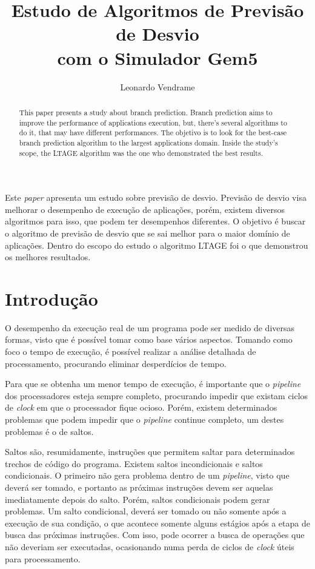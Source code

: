 \documentclass[12pt]{article}
\title{Estudo de Algoritmos de Previsão de Desvio\\com o Simulador Gem5}
\author{Leonardo Vendrame\inst{1}}
\begin{document}
 

\maketitle

\begin{abstract}
  This paper presents a study about branch prediction. Branch prediction aims to improve the performance
  of applications execution, but, there's several algorithms to do it, that may have different performances.
  The objetivo is to look for the best-case branch prediction algorithm to the largest applications domain.
  Inside the study's scope, the LTAGE algorithm was the one who demonstrated the best results.
\end{abstract}
     
\begin{resumo} 
  Este \textit{paper} apresenta um estudo sobre previsão de desvio. Previsão de desvio visa melhorar
  o desempenho de execução de aplicações, porém, existem diversos algoritmos para isso, que podem
  ter desempenhos diferentes. O objetivo é buscar o algoritmo de previsão de desvio que se sai melhor para
  o maior domínio de aplicações. Dentro do escopo do estudo o algoritmo LTAGE foi o que demonstrou os
  melhores resultados.
\end{resumo}


\section{Introdução}

O desempenho da execução real de um programa pode ser medido de diversas formas,
visto que é possível tomar como base vários aspectos. Tomando como foco o tempo de execução, é possível
realizar a análise detalhada de processamento, procurando eliminar desperdícios de tempo.

Para que se obtenha um menor tempo de execução, é importante que o \textit{pipeline} dos processadores esteja 
sempre completo, procurando impedir que existam ciclos de \textit{clock} em que o processador fique ocioso. 
Porém, existem determinados problemas que podem impedir que o \textit{pipeline} continue completo, 
um destes problemas é o de saltos. 

Saltos são, resumidamente, instruções que permitem saltar para determinados trechos de
código do programa. Existem saltos incondicionais e saltos condicionais. O primeiro não gera
problema dentro de um \textit{pipeline}, visto que deverá ser tomado, e portanto as próximas
instruções devem ser aquelas imediatamente depois do salto. Porém, saltos condicionais podem
gerar problemas. Um salto condicional, deverá ser tomado ou não somente após a execução de sua condição,
o que acontece somente alguns estágios após a etapa de busca das próximas instruções. Com isso,
pode ocorrer a busca de operações que não deveriam ser executadas, ocasionando numa perda de ciclos
de \textit{clock} úteis para processamento.
\end{document}
